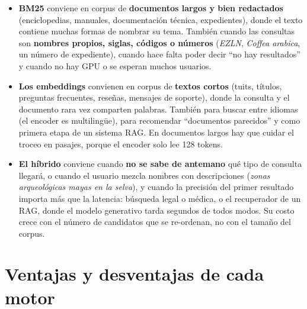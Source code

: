 \documentclass[11pt,letterpaper]{article}
\begin{document}
\begin{itemize}
\item \textbf{BM25} conviene en corpus de \textbf{documentos largos y bien redactados} (enciclopedias, manuales, documentación técnica, expedientes), donde el texto contiene muchas formas de nombrar su tema. También cuando las consultas son \textbf{nombres propios, siglas, códigos o números} (\emph{EZLN}, \emph{Coffea arabica}, un número de expediente), cuando hace falta poder decir ``no hay resultados'' y cuando no hay GPU o se esperan muchos usuarios.
\item \textbf{Los embeddings} convienen en corpus de \textbf{textos cortos} (tuits, títulos, preguntas frecuentes, reseñas, mensajes de soporte), donde la consulta y el documento rara vez comparten palabras. También para buscar entre idiomas (el encoder es multilingüe), para recomendar ``documentos parecidos'' y como primera etapa de un sistema RAG. En documentos largos hay que cuidar el troceo en pasajes, porque el encoder solo lee 128 tokens.
\item \textbf{El híbrido} conviene cuando \textbf{no se sabe de antemano} qué tipo de consulta llegará, o cuando el usuario mezcla nombres con descripciones (\emph{zonas arqueológicas mayas en la selva}), y cuando la precisión del primer resultado importa más que la latencia: búsqueda legal o médica, o el recuperador de un RAG, donde el modelo generativo tarda segundos de todos modos. Su costo crece con el número de candidatos que se re-ordenan, no con el tamaño del corpus.
\end{itemize}

\section{Ventajas y desventajas de cada motor}
\end{document}
